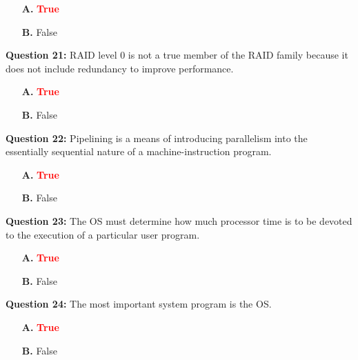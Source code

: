 \documentclass[12pt,a4paper]{article}
\begin{document}
\begin{itemize}
    \item[\textbf{A.}] \textcolor{red}{\textbf{True}}
    \item[\textbf{B.}] False
\end{itemize}

\vspace{0.5cm}

\textbf{Question 21:} RAID level 0 is not a true member of the RAID family because it does not include redundancy to improve performance.

\begin{itemize}
    \item[\textbf{A.}] \textcolor{red}{\textbf{True}}
    \item[\textbf{B.}] False
\end{itemize}

\vspace{0.5cm}

\textbf{Question 22:} Pipelining is a means of introducing parallelism into the essentially sequential nature of a machine-instruction program.

\begin{itemize}
    \item[\textbf{A.}] \textcolor{red}{\textbf{True}}
    \item[\textbf{B.}] False
\end{itemize}

\vspace{0.5cm}

\textbf{Question 23:} The OS must determine how much processor time is to be devoted to the execution of a particular user program.

\begin{itemize}
    \item[\textbf{A.}] \textcolor{red}{\textbf{True}}
    \item[\textbf{B.}] False
\end{itemize}

\vspace{0.5cm}

\textbf{Question 24:} The most important system program is the OS.

\begin{itemize}
    \item[\textbf{A.}] \textcolor{red}{\textbf{True}}
    \item[\textbf{B.}] False
\end{itemize}

\vspace{0.5cm}
\end{document}
